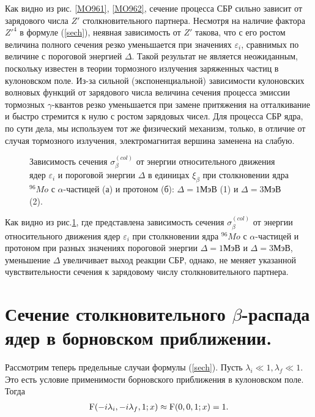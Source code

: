 Как видно из рис. \ref{MO961}, \ref{MO962}, сечение процесса СБР сильно зависит от зарядового числа
$Z'$ столкновительного партнера. Несмотря на  наличие фактора ${Z'}^4$
в формуле (\ref{sech}),
неявная зависимость от  $Z'$ такова, что с его ростом
величина полного сечения
резко уменьшается   при  значениях $\varepsilon_i$,
сравнимых по величине с пороговой энергией $\Delta$.
Такой результат не является неожиданным, поскольку известен в теории тормозного
излучения заряженных частиц в кулоновском поле. Из-за сильной (экспоненциальной)
зависимости кулоновских волновых функций от зарядового числа
величина сечения процесса эмиссии тормозных $\gamma$-квантов резко уменьшается
при замене
притяжения на отталкивание и быстро стремится к нулю с ростом зарядовых чисел.
Для  процесса СБР ядра, по сути дела, мы используем тот же
физический механизм, только, в отличие от случая тормозного излучения, электромагнитая
вершина заменена на слабую.

\begin{figure}
\vspace{18 true cm}
\caption{{ Зависимость сечения  $\sigma^{(col)}_\beta$ от энергии относительного
движения ядер $\varepsilon_i$ и пороговой энергии $\Delta$ в единицах $\xi_\beta$ при столкновении
ядра ${}^{96}Mo$ с $\alpha$-частицей (а) и протоном (б):
$\Delta=1 МэВ$ (1) и $\Delta=3 МэВ$ (2).}}
\label{MO96P}
\end{figure}




Как видно из  рис.\ref{MO96P}, где представлена зависимость
сечения  $\sigma^{(col)}_\beta$ от энергии относительного
движения ядер $\varepsilon_i$   при столкновении
ядра ${}^{96}Mo$ с $\alpha$-частицей  и протоном при разных значениях  пороговой энергии
$\Delta=1 МэВ$  и $\Delta=3 МэВ$,
уменьшение $\Delta$ увеличивает выход реакции
СБР, однако, не меняет указанной чувствительности сечения  к зарядовому числу
столкновительного партнера.




\section{Сечение столкновительного $\beta$-распада\\ ядер в
борновском приближении.}

Рассмотрим теперь предельные случаи формулы (\ref{sech}).
Пусть $\lambda_i \ll 1,  \lambda_f \ll 1.$
Это есть условие применимости борновского приближения в
кулоновском поле.
Тогда
\begin{eqnarray}
{\rm F}(-i\lambda_i,-i\lambda_f,1;x)\approx {\rm F}(0,0,1;x)=1.\nonumber
\end{eqnarray}

